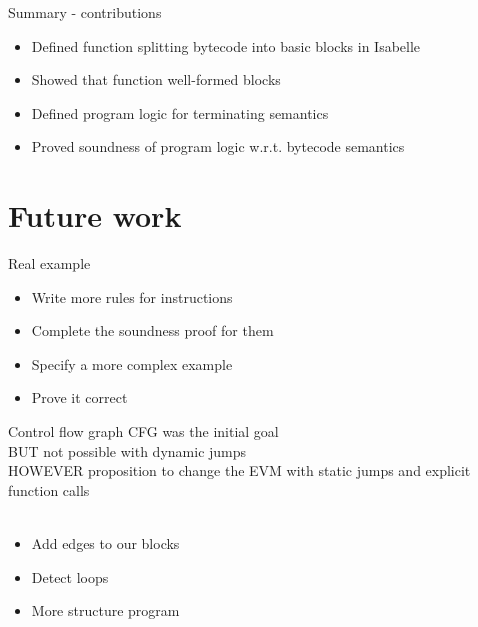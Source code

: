 \documentclass{beamer}
\begin{document}
\begin{frame}{Summary - contributions}
	\begin{itemize}
		\item Defined function splitting bytecode into basic blocks in Isabelle
		\item Showed that function well-formed blocks
		\item Defined program logic for terminating semantics
		\item Proved soundness of program logic w.r.t. bytecode semantics
	\end{itemize}
\end{frame}

\part{Future work}
\frame{\partpage}

\begin{frame}{Real example}
	\begin{itemize}
		\item Write more rules for instructions
		\item Complete the soundness proof for them
		\item Specify a more complex example
		\item Prove it correct
	\end{itemize}
\end{frame}

\begin{frame}{Control flow graph}
	CFG was the initial goal\\
	BUT not possible with dynamic jumps\\
	HOWEVER proposition to change the EVM with static jumps and explicit function calls
	\\~\\
	\begin{itemize}
		\item Add edges to our blocks
		\item Detect loops
		\item More structure program
	\end{itemize}
\end{frame}




\end{document}
